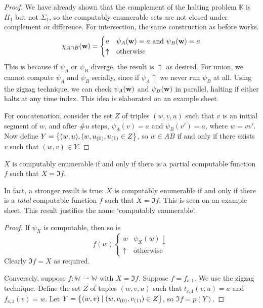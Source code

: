 \begin{proof}
	We have already shown that the complement of the halting problem \( \mathbb K \) is \( \Pi_1 \) but not \( \Sigma_1 \), so the computably enumerable sets are not closed under complement or difference.
	For intersection, the same construction as before works.
	\[ \chi_{A \cap B}(\vb w) = \begin{cases}
		a & \psi_A(\vb w) = a \text{ and } \psi_B(\vb w) = a \\
		\uparrow & \text{otherwise}
	\end{cases} \]
	This is because if \( \psi_A \) or \( \psi_B \) diverge, the result is \( \uparrow \) as desired.
	For union, we cannot compute \( \psi_A \) and \( \psi_B \) serially, since if \( \psi_A \uparrow \) we never run \( \psi_B \) at all.
	Using the zigzag technique, we can check \( \psi_A(\vb w) \) and \( \psi_B(\vb w) \) in parallel, halting if either halts at any time index.
	This idea is elaborated on an example sheet.

	For concatenation, consider the set \( Z \) of triples \( (w, v, u) \) such that \( v \) is an initial segment of \( w \), and after \( \#u \) steps, \( \psi_A(v) = a \) and \( \psi_B(v') = a \), where \( w = vv' \).
	Now define \( Y = \qty{(w, u), (w, u_{(0)}, u_{(1)} \in Z} \), so \( w \in AB \) if and only if there exists \( v \) such that \( (w, v) \in Y \).
\end{proof}
\begin{proposition}
	\( X \) is computably enumerable if and only if there is a partial computable function \( f \) such that \( X = \Im f \).
\end{proposition}
\begin{remark}
	In fact, a stronger result is true: \( X \) is computably enumerable if and only if there is a \emph{total} computable function \( f \) such that \( X = \Im f \).
	This is seen on an example sheet.
	This result justifies the name `computably enumerable'.
\end{remark}
\begin{proof}
	If \( \psi_X \) is computable, then so is
	\[ f(w) \begin{cases}
		w & \psi_X(w) \downarrow \\
		\uparrow & \text{otherwise}
	\end{cases} \]
	Clearly \( \Im f = X \) as required.

	Conversely, suppose \( f \colon \mathbb W \rightharpoonup \mathbb W \) with \( X = \Im f \).
	Suppose \( f = f_{c,1} \).
	We use the zigzag technique.
	Define the set \( Z \) of tuples \( (w, v, u) \) such that \( t_{c,1}(v,u) = a \) and \( f_{c,1}(v) = w \).
	Let \( Y = \qty{(w,v) \mid (w, v_{(0)}, v_{(1)}) \in Z} \), so \( \Im f = p(Y) \).
\end{proof}

